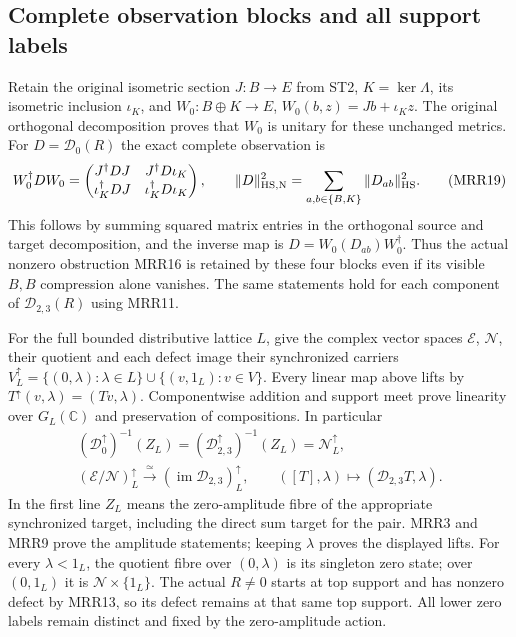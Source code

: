 \subsection{Complete observation blocks and all support labels}

Retain the original isometric section $J:B\to E$ from ST2,
$K=\ker\Lambda$, its isometric inclusion $\iota_K$, and
$W_0:B\oplus K\to E$, $W_0(b,z)=Jb+\iota_Kz$.
The original orthogonal decomposition proves that $W_0$ is
unitary for these unchanged metrics.
For $D=\mathcal D_0(R)$ the exact complete observation is
\[
W_0^\dagger D W_0=
\begin{pmatrix}
J^\dagger DJ&J^\dagger D\iota_K\\
\iota_K^\dagger DJ&\iota_K^\dagger D\iota_K
\end{pmatrix},\qquad
\|D\|_{\rm HS,N}^2
=\sum_{a,b\in\{B,K\}}\|D_{ab}\|_{\rm HS}^2.
\tag{MRR19}
\]
This follows by summing squared matrix entries in the
orthogonal source and target decomposition, and the inverse
map is $D=W_0(D_{ab})W_0^\dagger$.
Thus the actual nonzero obstruction MRR16 is retained by
these four blocks even if its visible $B,B$ compression
alone vanishes. The same statements hold for each component
of $\mathcal D_{2,3}(R)$ using MRR11.

For the full bounded distributive lattice $L$, give the
complex vector spaces $\mathcal E$, $\mathscr N$, their
quotient and each defect image their synchronized carriers
$V_L^\uparrow=\{(0,\lambda):\lambda\in L\}
\cup\{(v,1_L):v\in V\}$.
Every linear map above lifts by
$T^\uparrow(v,\lambda)=(Tv,\lambda)$.
Componentwise addition and support meet prove linearity
over $G_L(\mathbb C)$ and preservation of compositions.
In particular
\[
\begin{gathered}
(\mathcal D_0^\uparrow)^{-1}(Z_L)
=(\mathcal D_{2,3}^\uparrow)^{-1}(Z_L)
=\mathscr N_L^\uparrow,\\
(\mathcal E/\mathscr N)_L^\uparrow
\xrightarrow{\ \simeq\ }
(\operatorname{im}\mathcal D_{2,3})_L^\uparrow,
\qquad([T],\lambda)\longmapsto
                        (\mathcal D_{2,3}T,\lambda).
\end{gathered}
\tag{MRR20}
\]
In the first line $Z_L$ means the zero-amplitude fibre of
the appropriate synchronized target, including the direct
sum target for the pair. MRR3 and MRR9 prove the amplitude
statements; keeping $\lambda$ proves the displayed lifts.
For every $\lambda<1_L$, the quotient fibre over
$(0,\lambda)$ is its singleton zero state; over $(0,1_L)$
it is $\mathscr N\times\{1_L\}$.
The actual $R\ne0$ starts at top support and has nonzero
defect by MRR13, so its defect remains at that same top
support. All lower zero labels remain distinct and fixed
by the zero-amplitude action.

